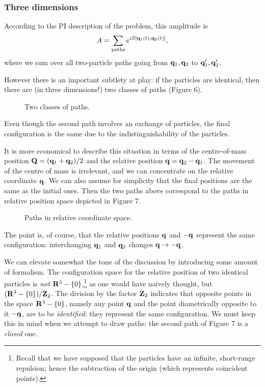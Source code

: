 \documentclass[12pt]{article}
\begin{document}
\subsubsection{Three dimensions}

According to the PI description of the problem, this amplitude is
\[ A=\sum_{\mathrm{paths}}e^{iS[{\mathbf q}_1(t),{\mathbf q}_2(t)]},
\]
where we sum over all two-particle paths going from ${\mathbf q}_1,{\mathbf q}_2$ to
${\mathbf q}_1',{\mathbf q}_2'$.

However there is an important subtlety at play: if the particles are
identical, then there are (in three dimensions!) two classes of paths
(Figure 6).
\begin{figure}[hb]
\epsfysize=4cm
\centerline{}
\caption{Two classes of paths.}
\end{figure}

Even though the second path involves an exchange of particles, the
final configuration is the same due to the indistinguishability of the
particles.

It is more economical to describe this situation in terms of the
centre-of-mass position ${\mathbf Q}=({\mathbf q}_1+{\mathbf q}_2)/2$ and the relative
position ${\mathbf q}={\mathbf q}_2-{\mathbf q}_1$. The movement of the centre of mass is
irrelevant, and we can concentrate on the relative coordinate
${\mathbf q}$. We can also assume for simplicity that the final positions are
the same as the initial ones. Then the two paths above correspond to
the paths in relative position space depicted in Figure 7.
\begin{figure}[hb]
\epsfysize=5cm
\centerline{}
\caption{Paths in relative coordinate space.}
\end{figure}


The point is, of course, that the relative positions ${\mathbf q}$ and
$-{\mathbf q}$ represent the same configuration: interchanging ${\mathbf q}_1$ and
${\mathbf q}_2$ changes ${\mathbf q}\to-{\mathbf q}$.

We can elevate somewhat the tone of the discussion by introducing some
amount of formalism. The configuration space for the relative position
of two identical particles is {\em not} ${\mathbf R}^3-\{0\}$,\footnote{Recall
  that we have supposed that the particles have an infinite,
  short-range repulsion; hence the subtraction of the origin (which
  represents coincident points).} as one would have naively thought,
but $({\mathbf R}^3-\{0\})/{\mathbf Z}_2$. The
division by the factor ${\mathbf Z}_2$ indicates that opposite points in the
space ${\mathbf R}^3-\{0\}$, namely any point ${\mathbf q}$ and the point
diametrically opposite to it $-{\mathbf q}$, are to be {\em
identified}: they represent the same configuration. We must keep this
in mind when we attempt to draw paths: the second path of Figure 7
is a {\em closed} one.
\end{document}
